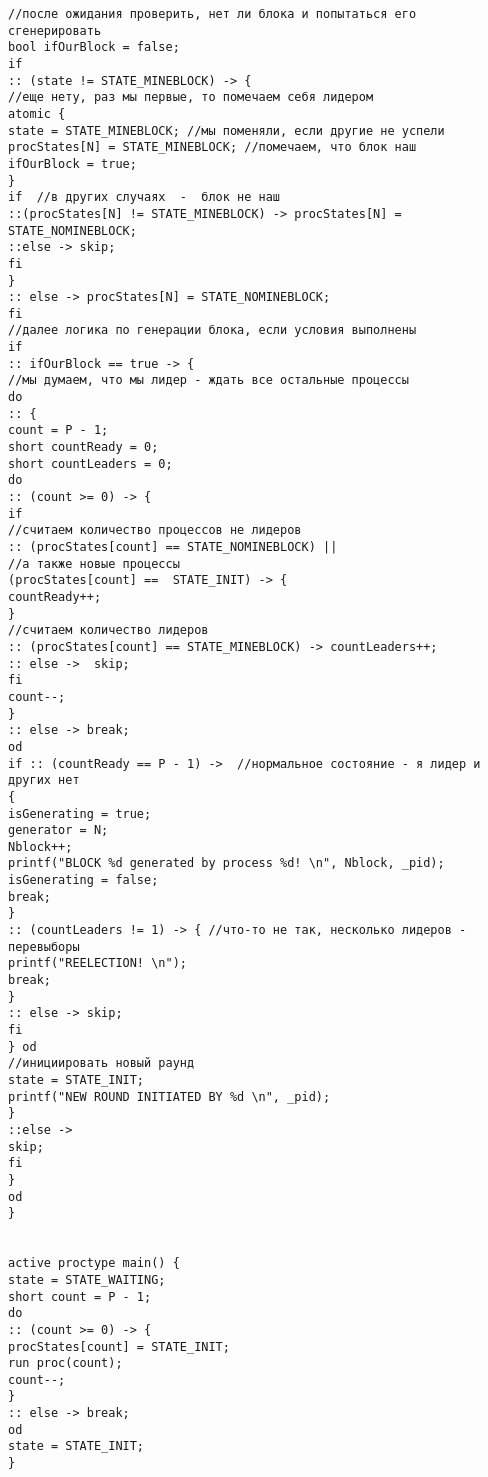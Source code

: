\begin{lstlisting}[language=Promela]
//после ожидания проверить, нет ли блока и попытаться его сгенерировать
bool ifOurBlock = false;
if 
:: (state != STATE_MINEBLOCK) -> {
//еще нету, раз мы первые, то помечаем себя лидером
atomic {
state = STATE_MINEBLOCK; //мы поменяли, если другие не успели
procStates[N] = STATE_MINEBLOCK; //помечаем, что блок наш
ifOurBlock = true; 
}
if  //в других случаях  -  блок не наш
::(procStates[N] != STATE_MINEBLOCK) -> procStates[N] = STATE_NOMINEBLOCK; 
::else -> skip;
fi
}
:: else -> procStates[N] = STATE_NOMINEBLOCK;
fi
//далее логика по генерации блока, если условия выполнены
if 
:: ifOurBlock == true -> {
//мы думаем, что мы лидер - ждать все остальные процессы
do 
:: {
count = P - 1;
short countReady = 0; 
short countLeaders = 0; 
do
:: (count >= 0) -> {
if
//считаем количество процессов не лидеров
:: (procStates[count] == STATE_NOMINEBLOCK) || 
//а также новые процессы
(procStates[count] ==  STATE_INIT) -> {
countReady++; 
}
//считаем количество лидеров
:: (procStates[count] == STATE_MINEBLOCK) -> countLeaders++;
:: else ->  skip;
fi
count--;
}
:: else -> break;
od
if :: (countReady == P - 1) ->  //нормальное состояние - я лидер и других нет
{
isGenerating = true;
generator = N;
Nblock++;
printf("BLOCK %d generated by process %d! \n", Nblock, _pid);
isGenerating = false;
break;
}
:: (countLeaders != 1) -> { //что-то не так, несколько лидеров - перевыборы
printf("REELECTION! \n");
break;
}
:: else -> skip;
fi
} od
//инициировать новый раунд
state = STATE_INIT;
printf("NEW ROUND INITIATED BY %d \n", _pid);
}
::else -> 
skip;
fi
}
od
} 


active proctype main() {
state = STATE_WAITING;
short count = P - 1;
do
:: (count >= 0) -> {
procStates[count] = STATE_INIT;
run proc(count);
count--;
}
:: else -> break;
od
state = STATE_INIT;
}

\end{lstlisting}